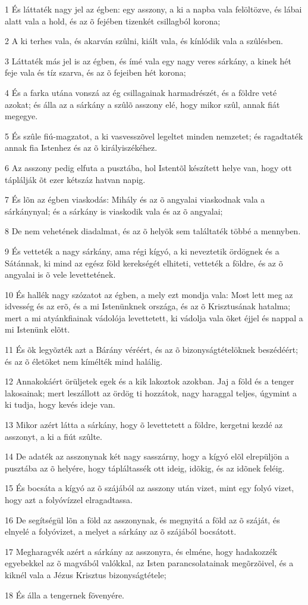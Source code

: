 \par 1 És láttaték nagy jel az égben: egy asszony, a ki a napba vala felöltözve, és lábai alatt vala a hold, és az õ fejében tizenkét csillagból korona;
\par 2 A ki terhes vala, és akarván szûlni, kiált vala, és kínlódik vala a szûlésben.
\par 3 Láttaték más jel is az égben, és ímé vala egy nagy veres sárkány, a kinek hét feje vala és tíz szarva, és az õ fejeiben hét korona;
\par 4 És a farka utána vonszá az ég csillagainak harmadrészét, és a földre veté azokat; és álla az a sárkány a szûlõ asszony  elé, hogy mikor szûl, annak fiát megegye.
\par 5 És szûle fiú-magzatot, a ki vasvesszõvel legeltet minden nemzetet; és ragadtaték annak fia Istenhez és az õ királyiszékéhez.
\par 6 Az asszony pedig elfuta a pusztába, hol Istentõl készített helye van, hogy ott táplálják õt ezer kétszáz hatvan napig.
\par 7 És lõn az égben viaskodás: Mihály és az õ angyalai viaskodnak vala a sárkánynyal; és a sárkány is viaskodik vala és az õ angyalai;
\par 8 De nem vehetének diadalmat, és az õ helyök sem találtaték többé a mennyben.
\par 9 És vetteték a nagy sárkány, ama régi kígyó, a ki neveztetik ördögnek és a Sátánnak, ki mind az egész föld kerekségét elhiteti, vetteték a földre, és az õ angyalai is õ vele levettetének.
\par 10 És hallék nagy szózatot az égben, a mely ezt mondja vala: Most lett meg az idvesség és az erõ, és a mi Istenünknek országa, és  az õ Krisztusának hatalma; mert a mi atyánkfiainak vádolója levettetett, ki vádolja vala õket éjjel és nappal a mi Istenünk elõtt.
\par 11 És õk legyõzték azt a Bárány véréért, és az õ bizonyságtételöknek beszédéért; és az õ életöket nem kímélték mind halálig.
\par 12 Annakokáért örüljetek egek és a kik lakoztok azokban. Jaj a föld és a tenger lakosainak; mert leszállott az ördög ti hozzátok, nagy haraggal teljes, úgymint a ki tudja, hogy kevés ideje van.
\par 13 Mikor azért látta a sárkány, hogy õ levettetett a földre, kergetni kezdé az asszonyt,  a ki a fiút szûlte.
\par 14 De adaték az asszonynak két nagy sasszárny, hogy a kígyó  elõl elrepüljön a pusztába az õ helyére, hogy tápláltassék ott ideig, idõkig, és  az idõnek feléig.
\par 15 És bocsáta a kígyó az õ szájából az asszony után vizet, mint egy folyó vizet, hogy azt a folyóvízzel elragadtassa.
\par 16 De segítségül lõn a föld az asszonynak, és megnyitá a föld az õ száját, és elnyelé a folyóvizet, a melyet a sárkány az õ szájából bocsátott.
\par 17 Megharagvék azért a sárkány az asszonyra, és elméne, hogy hadakozzék egyebekkel az õ magvából valókkal, az Isten parancsolatainak megõrzõivel, és a kiknél vala a Jézus Krisztus bizonyságtétele;
\par 18 És álla a tengernek fövenyére.

